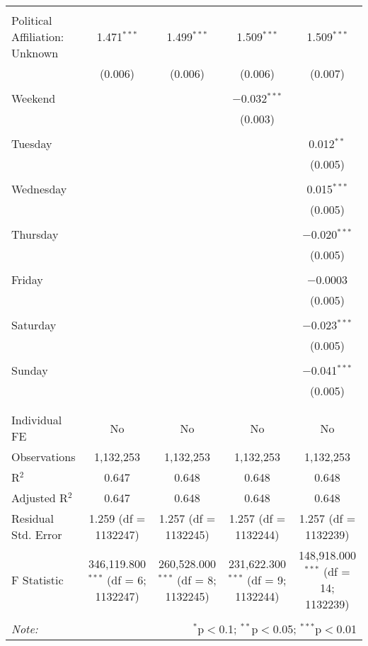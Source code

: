 \documentclass[
]{article}
\begin{document}
\begin{table}[!htbp]
{\begin{tabular}{@{\extracolsep{5pt}}lcccc}
  & & & & \\ 
 Political Affiliation: Unknown & 1.471$^{***}$ & 1.499$^{***}$ & 1.509$^{***}$ & 1.509$^{***}$ \\ 
  & (0.006) & (0.006) & (0.006) & (0.007) \\ 
  & & & & \\ 
 Weekend &  &  & $-$0.032$^{***}$ &  \\ 
  &  &  & (0.003) &  \\ 
  & & & & \\ 
 Tuesday &  &  &  & 0.012$^{**}$ \\ 
  &  &  &  & (0.005) \\ 
  & & & & \\ 
 Wednesday &  &  &  & 0.015$^{***}$ \\ 
  &  &  &  & (0.005) \\ 
  & & & & \\ 
 Thursday &  &  &  & $-$0.020$^{***}$ \\ 
  &  &  &  & (0.005) \\ 
  & & & & \\ 
 Friday &  &  &  & $-$0.0003 \\ 
  &  &  &  & (0.005) \\ 
  & & & & \\ 
 Saturday &  &  &  & $-$0.023$^{***}$ \\ 
  &  &  &  & (0.005) \\ 
  & & & & \\ 
 Sunday &  &  &  & $-$0.041$^{***}$ \\ 
  &  &  &  & (0.005) \\ 
  & & & & \\ 
\hline \\[-1.8ex] 
Individual FE & No & No & No & No \\ 
Observations & 1,132,253 & 1,132,253 & 1,132,253 & 1,132,253 \\ 
R$^{2}$ & 0.647 & 0.648 & 0.648 & 0.648 \\ 
Adjusted R$^{2}$ & 0.647 & 0.648 & 0.648 & 0.648 \\ 
Residual Std. Error & 1.259 (df = 1132247) & 1.257 (df = 1132245) & 1.257 (df = 1132244) & 1.257 (df = 1132239) \\ 
F Statistic & 346,119.800$^{***}$ (df = 6; 1132247) & 260,528.000$^{***}$ (df = 8; 1132245) & 231,622.300$^{***}$ (df = 9; 1132244) & 148,918.000$^{***}$ (df = 14; 1132239) \\ 
\hline 
\hline \\[-1.8ex] 
\textit{Note:}  & \multicolumn{4}{r}{$^{*}$p$<$0.1; $^{**}$p$<$0.05; $^{***}$p$<$0.01} \\ 
\end{tabular}
} 
\end{table} 
\newpage
\end{document}
